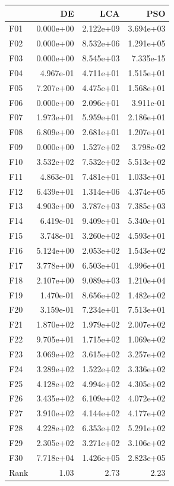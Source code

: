 \begin{tabular}{lrrr}
\toprule
 & DE & LCA & PSO \\
\midrule
F01 & 0.000e+00 & 2.122e+09 & 3.694e+03 \\
F02 & 0.000e+00 & 8.532e+06 & 1.291e+05 \\
F03 & 0.000e+00 & 8.545e+03 & 7.335e-15 \\
F04 & 4.967e-01 & 4.711e+01 & 1.515e+01 \\
F05 & 7.207e+00 & 4.475e+01 & 1.568e+01 \\
F06 & 0.000e+00 & 2.096e+01 & 3.911e-01 \\
F07 & 1.973e+01 & 5.959e+01 & 2.186e+01 \\
F08 & 6.809e+00 & 2.681e+01 & 1.207e+01 \\
F09 & 0.000e+00 & 1.527e+02 & 3.798e-02 \\
F10 & 3.532e+02 & 7.532e+02 & 5.513e+02 \\
F11 & 4.863e-01 & 7.481e+01 & 1.033e+01 \\
F12 & 6.439e+01 & 1.314e+06 & 4.374e+05 \\
F13 & 4.903e+00 & 3.787e+03 & 7.385e+03 \\
F14 & 6.419e-01 & 9.409e+01 & 5.340e+01 \\
F15 & 3.748e-01 & 3.260e+02 & 4.593e+01 \\
F16 & 5.124e+00 & 2.053e+02 & 1.543e+02 \\
F17 & 3.778e+00 & 6.503e+01 & 4.996e+01 \\
F18 & 2.107e+00 & 9.089e+03 & 1.210e+04 \\
F19 & 1.470e-01 & 8.656e+02 & 1.482e+02 \\
F20 & 3.159e-01 & 7.234e+01 & 7.513e+01 \\
F21 & 1.870e+02 & 1.979e+02 & 2.007e+02 \\
F22 & 9.705e+01 & 1.715e+02 & 1.069e+02 \\
F23 & 3.069e+02 & 3.615e+02 & 3.257e+02 \\
F24 & 3.289e+02 & 1.522e+02 & 3.336e+02 \\
F25 & 4.128e+02 & 4.994e+02 & 4.305e+02 \\
F26 & 3.435e+02 & 6.109e+02 & 4.072e+02 \\
F27 & 3.910e+02 & 4.144e+02 & 4.177e+02 \\
F28 & 4.228e+02 & 6.353e+02 & 5.291e+02 \\
F29 & 2.305e+02 & 3.271e+02 & 3.106e+02 \\
F30 & 7.718e+04 & 1.426e+05 & 2.823e+05 \\
\midrule
Rank & 1.03 & 2.73 & 2.23 \\
\bottomrule
\end{tabular}
